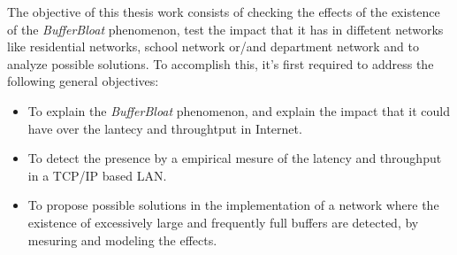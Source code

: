 The objective of this thesis work consists of checking the effects of the existence of the \textit{BufferBloat} phenomenon, test the impact that it has in diffetent networks like residential networks, school network or/and department network and to analyze possible solutions. To accomplish this, it's first required to address the following general objectives:
\begin{center}
\begin{itemize}
\item To explain the \textit{BufferBloat} phenomenon, and explain the impact that it could have over the lantecy and throughtput in Internet.  
\item To detect the presence by a empirical mesure of the latency and throughput in a TCP/IP based LAN. 
\item To propose possible solutions in the implementation of a network where the existence of excessively large and frequently full buffers are detected, by mesuring and modeling the effects.
\end{itemize}
\end{center}
